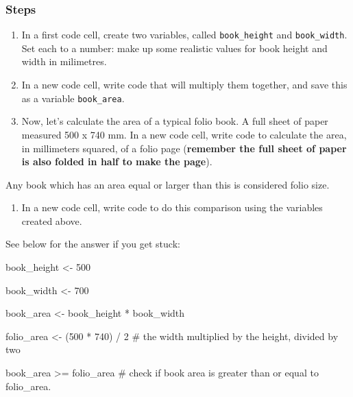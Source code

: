 \documentclass[
  letterpaper,
  DIV=11,
  numbers=noendperiod]{scrreprt}
\newenvironment{Shaded}{\begin{snugshade}}{\end{snugshade}}
\newcommand{\CommentTok}[1]{\textcolor[rgb]{0.37,0.37,0.37}{#1}}
\newcommand{\DecValTok}[1]{\textcolor[rgb]{0.68,0.00,0.00}{#1}}
\newcommand{\NormalTok}[1]{\textcolor[rgb]{0.00,0.23,0.31}{#1}}
\newcommand{\OtherTok}[1]{\textcolor[rgb]{0.00,0.23,0.31}{#1}}
\newcommand{\SpecialCharTok}[1]{\textcolor[rgb]{0.37,0.37,0.37}{#1}}
\providecommand{\tightlist}{%
  \setlength{\itemsep}{0pt}\setlength{\parskip}{0pt}}
\begin{document}
\subsubsection{Steps}\label{steps}

\begin{enumerate}
\def\labelenumi{\arabic{enumi}.}
\item
  In a first code cell, create two variables, called
  \texttt{book\_height} and \texttt{book\_width}. Set each to a number:
  make up some realistic values for book height and width in milimetres.
\item
  In a new code cell, write code that will multiply them together, and
  save this as a variable \texttt{book\_area}.
\item
  Now, let's calculate the area of a typical folio book. A full sheet of
  paper measured 500 x 740 mm. In a new code cell, write code to
  calculate the area, in millimeters squared, of a folio page
  (\textbf{remember the full sheet of paper is also folded in half to
  make the page}).
\end{enumerate}

Any book which has an area equal or larger than this is considered folio
size.

\begin{enumerate}
\def\labelenumi{\arabic{enumi}.}
\setcounter{enumi}{3}
\tightlist
\item
  In a new code cell, write code to do this comparison using the
  variables created above.
\end{enumerate}

See below for the answer if you get stuck:

\begin{Shaded}
\begin{Highlighting}[]
\NormalTok{book\_height }\OtherTok{\textless{}{-}} \DecValTok{500}

\NormalTok{book\_width }\OtherTok{\textless{}{-}} \DecValTok{700}

\NormalTok{book\_area }\OtherTok{\textless{}{-}}\NormalTok{ book\_height }\SpecialCharTok{*}\NormalTok{ book\_width}

\NormalTok{folio\_area }\OtherTok{\textless{}{-}}\NormalTok{ (}\DecValTok{500} \SpecialCharTok{*} \DecValTok{740}\NormalTok{) }\SpecialCharTok{/} \DecValTok{2} \CommentTok{\# the width multiplied by the height, divided by two}

\NormalTok{book\_area }\SpecialCharTok{\textgreater{}=}\NormalTok{ folio\_area }\CommentTok{\# check if book area is greater than or equal to folio\_area.}
\end{Highlighting}
\end{Shaded}
\end{document}
